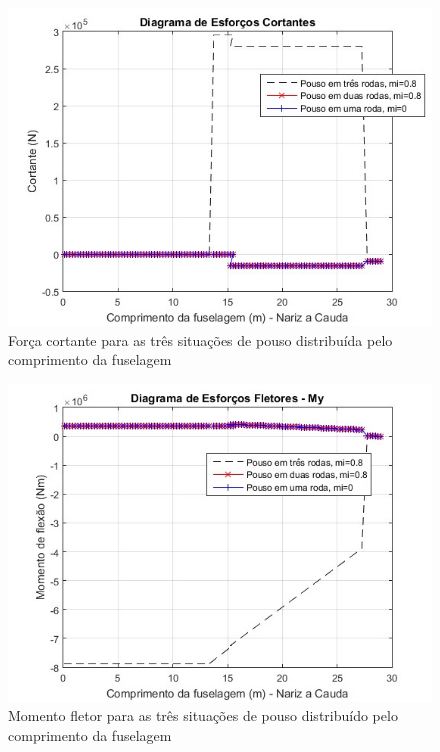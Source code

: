 \begin{figure}
\centering
\includegraphics[width=\textwidth]{cargas/imagens/cort_FUS.jpg}
\caption{Força cortante para as três situações de pouso distribuída pelo comprimento da fuselagem}
\label{fig:cort_FUS}
\end{figure}

\begin{figure}
\centering
\includegraphics[width=\textwidth]{cargas/imagens/flet_FUS.jpg}
\caption{Momento fletor para as três situações de pouso distribuído pelo comprimento da fuselagem }
\label{fig:flet_FUS}
\end{figure}

